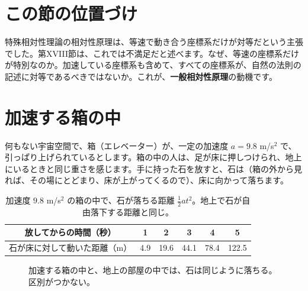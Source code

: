 \documentclass[a4paper,11pt,openany]{ltjsbook}
\begin{document}
\section{この節の位置づけ}

特殊相対性理論の相対性原理は、等速で動き合う座標系だけが対等だという主張でした。第XVIII節は、これでは不満足だと述べます。なぜ、等速の座標系だけが特別なのか。加速している座標系も含めて、すべての座標系が、自然の法則の記述に対等であるべきではないか。これが、\textbf{一般相対性原理}の動機です。

\section{加速する箱の中}

何もない宇宙空間で、箱（エレベーター）が、一定の加速度 $a=9.8$ m/s$^2$ で、引っぱり上げられているとします。箱の中の人は、足が床に押しつけられ、地上にいるときと同じ重さを感じます。手に持った石を放すと、石は（箱の外から見れば、その場にとどまり、床が上がってくるので）、床に向かって落ちます。

\begin{table}[htbp]
\centering
\begin{tabular}{c|ccccc}
\toprule
放してからの時間（秒） & 1 & 2 & 3 & 4 & 5\\
\midrule
石が床に対して動いた距離（m） & 4.9 & 19.6 & 44.1 & 78.4 & 122.5\\
\bottomrule
\end{tabular}
\caption{加速度 $9.8$ m/s$^2$ の箱の中で、石が落ちる距離 $\tfrac12at^2$。地上で石が自由落下する距離と同じ。}
\end{table}

\begin{figure}[htbp]
\centering
{}
\caption{加速する箱の中と、地上の部屋の中では、石は同じように落ちる。区別がつかない。}
\end{figure}
\end{document}

